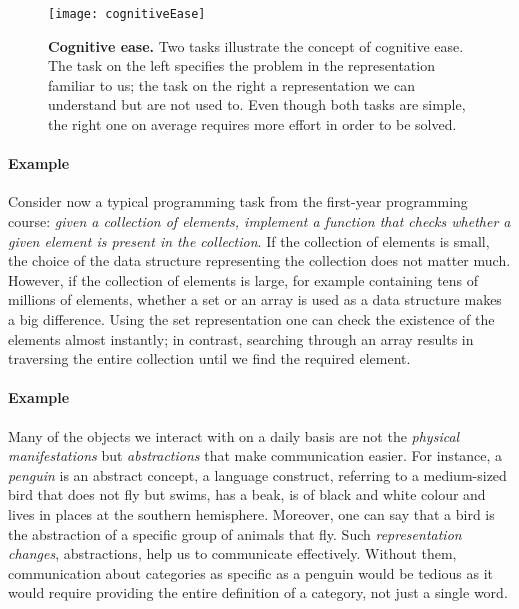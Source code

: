 \begin{figure}
	\centering
	\texttt{[image: cognitiveEase]}
	\caption[Cognitive ease]{\textbf{Cognitive ease.} Two tasks illustrate the concept of cognitive ease. The task on the left specifies the problem in the representation familiar to us; the task on the right a representation we can understand but are not used to. Even though both tasks are simple, the right one on average requires more effort in order to be solved.}
	\label{fig:cogease}
\end{figure}







\paragraph{Example} Consider now a typical programming task from the first-year programming course: \textit{given a collection of elements, implement a function that checks whether a given element is present in the collection}.
If the collection of elements is small, the choice of the data structure representing the collection does not matter much.
However, if the collection of elements is large, for example containing tens of millions of elements, whether a set or an array is used as a data structure makes a big difference.
Using the set representation one can check the existence of the elements almost instantly; in contrast, searching through an array results in traversing the entire collection until we find the required element.



\paragraph{Example}
Many of the objects we interact with on a daily basis are not the \textit{physical manifestations} but \textit{abstractions} that make communication easier.
For instance, a \textit{penguin} is an abstract concept, a language construct, referring to a medium-sized bird that does not fly but swims, has a beak, is of black and white colour and lives in places at the southern hemisphere.
Moreover, one can say that a bird is the abstraction of a specific group of animals that fly.
Such \textit{representation changes}, abstractions, help us to communicate effectively.
Without them, communication about categories as specific as a penguin would be tedious as it would  require providing the entire definition of a category, not just a single word.




